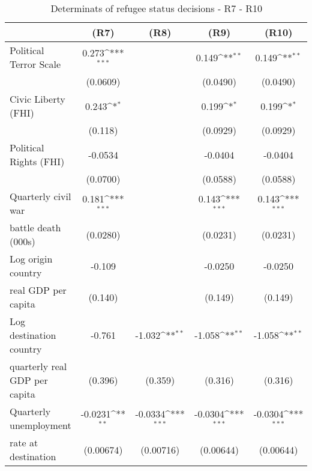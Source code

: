 \begin{table}[!ht]\centering \scriptsize
\def\sym#1{\ifmmode^{#1}\else\(^{#1}\)\fi}
\caption{Determinats of refugee status decisions - R7 - R10}
\begin{tabular}{l*{4}{c}}
\hline\hline
                    &\multicolumn{1}{c}{(R7)}&\multicolumn{1}{c}{(R8)}&\multicolumn{1}{c}{(R9)}&\multicolumn{1}{c}{(R10)}\\

\hline
Political Terror Scale&       0.273\sym{***}&                     &       0.149\sym{**} &       0.149\sym{**} \\
                    &    (0.0609)         &                     &    (0.0490)         &    (0.0490)         \\
[0,5em]
Civic Liberty (FHI) &       0.243\sym{*}  &                     &       0.199\sym{*}  &       0.199\sym{*}  \\
                    &     (0.118)         &                     &    (0.0929)         &    (0.0929)         \\
[0,5em]
Political Rights (FHI)&     -0.0534         &                     &     -0.0404         &     -0.0404         \\
                    &    (0.0700)         &                     &    (0.0588)         &    (0.0588)         \\
[0,5em]
Quarterly civil war &       0.181\sym{***}&                     &       0.143\sym{***}&       0.143\sym{***}\\
battle death (000s)                    &    (0.0280)         &                     &    (0.0231)         &    (0.0231)         \\
[0,5em]
Log origin country &      -0.109         &                     &     -0.0250         &     -0.0250         \\
real GDP per capita                    &     (0.140)         &                     &     (0.149)         &     (0.149)         \\
[0,5em]
Log destination country&      -0.761         &      -1.032\sym{**} &      -1.058\sym{**} &      -1.058\sym{**} \\
 quarterly real GDP per capita                    &     (0.396)         &     (0.359)         &     (0.316)         &     (0.316)         \\
[0,5em]
Quarterly unemployment&     -0.0231\sym{**} &     -0.0334\sym{***}&     -0.0304\sym{***}&     -0.0304\sym{***}\\
 rate at destination                    &   (0.00674)         &   (0.00716)         &   (0.00644)         &   (0.00644)         \\

\end{tabular}
\end{table}
